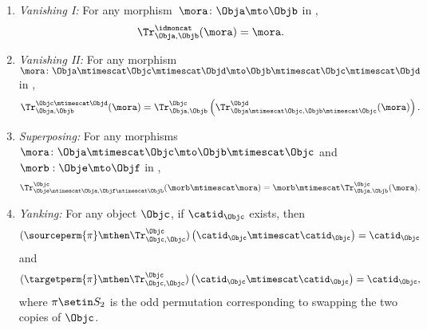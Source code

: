 \begin{ctdefinition}
\begin{enumerate}
        \item \emph{Vanishing I:}
              For any morphism~$\mora \colon \Obja\mto \Objb$ in \CatC,
              \begin{equation}
                  \label{eq:semicat-trace-vanishing_1}
                  \Tr_{\Obja,\Objb}^\idmoncat (\mora)=\mora.
              \end{equation}

        \item \emph{Vanishing II:}
              For any morphism~$\mora \colon \Obja\mtimescat \Objc \mtimescat \Objd \mto \Objb\mtimescat \Objc \mtimescat \Objd$ in \CatC,
              \begin{equation}
                  \label{eq:semicat-trace-vanishing_2}
                  \Tr_{\Obja,\Objb}^{\Objc\mtimescat \Objd}(\mora)=\Tr_{\Obja,\Objb}^\Objc\left(
                  \Tr_{\Obja \mtimescat \Objc , \Objb \mtimescat \Objc}^\Objd(\mora)\right).
              \end{equation}

        \item \emph{Superposing:}
              For any morphisms~$\mora\colon \Obja\mtimescat \Objc \mto \Objb\mtimescat \Objc$ and $\morb : \Obje \mto \Objf$ in \CatC,
              \begin{equation}
                  \label{eq:semicat-trace-superposing}
                  \Tr_{\Obje\mtimescat \Obja,\Objf\mtimescat \Objb}^{\Objc}(\morb \mtimescat \mora)=\morb \mtimescat \Tr_{\Obja,\Objb}^\Objc(\mora).
              \end{equation}

        \item \emph{Yanking:}
              For any object $\Objc$, if $\catid_\Objc$ exists, then
              \begin{equation}
                  \label{eq:semicat-trace-yanking-I}
                  (\sourceperm{\pi}   \mthen \Tr_{\Objc,\Objc}^\Objc)\left(\catid_\Objc \mtimescat \catid_\Objc \right)=\catid_\Objc
              \end{equation}
              and
              \begin{equation}
                  \label{eq:semicat-trace-yanking-II}
                  (\targetperm{\pi}  \mthen \Tr_{\Objc,\Objc}^\Objc)\left(\catid_\Objc \mtimescat \catid_\Objc \right)=\catid_\Objc,
              \end{equation}
              where $\pi \setin S_2$ is the odd permutation corresponding to swapping the two copies of $\Objc$.
    \end{enumerate}
\end{ctdefinition}

